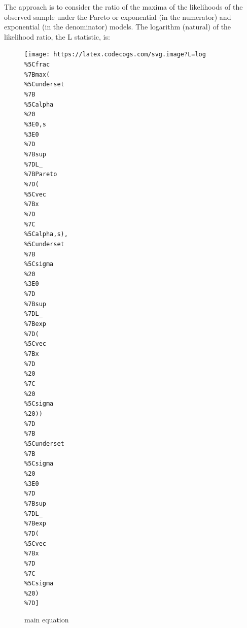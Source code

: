 \documentclass[
]{article}
\begin{document}
The approach is to consider the ratio of the maxima of the likelihoods
of the observed sample under the Pareto or exponential (in the
numerator) and exponential (in the denominator) models. The logarithm
(natural) of the likelihood ratio, the L statistic, is:

\begin{figure}
\centering
\texttt{[image: https://latex.codecogs.com/svg.image?L=log\\\%5Cfrac\\\%7Bmax(\\\%5Cunderset\\\%7B\\\%5Calpha\\\%20\\\%3E0,s\\\%3E0\\\%7D\\\%7Bsup\\\%7DL\_\\\%7BPareto\\\%7D(\\\%5Cvec\\\%7Bx\\\%7D\\\%7C\\\%5Calpha,s),\\\%5Cunderset\\\%7B\\\%5Csigma\\\%20\\\%3E0\\\%7D\\\%7Bsup\\\%7DL\_\\\%7Bexp\\\%7D(\\\%5Cvec\\\%7Bx\\\%7D\\\%20\\\%7C\\\%20\\\%5Csigma\\\%20))\\\%7D\\\%7B\\\%5Cunderset\\\%7B\\\%5Csigma\\\%20\\\%3E0\\\%7D\\\%7Bsup\\\%7DL\_\\\%7Bexp\\\%7D(\\\%5Cvec\\\%7Bx\\\%7D\\\%7C\\\%5Csigma\\\%20)\\\%7D]}
\caption{main equation}
\end{figure}
\end{document}
